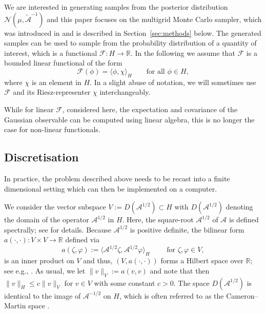 \documentclass[11pt,english]{article}
\theoremstyle{plain}
\theoremstyle{plain}
\theoremstyle{plain}
\theoremstyle{plain}
\numberwithin{equation}{section}
\newcommand{\rev}[1]{#1}
\newcommand{\jg}[1]{#1}
\begin{document}
We are interested in generating samples from the posterior distribution
$\mathcal{N}(\mu,\widetilde{\mathcal{A}}^{-1})$ and this paper focuses on the multigrid Monte Carlo sampler, which was introduced in \cite{goodman1989multigrid} and is described in Section~\ref{sec:methods} below.
\jg{The generated samples can be used to sample from the probability distribution of a quantity of interest,}   
which is a functional $\mathcal{F}:H\rightarrow \mathbb{R}$.
In the following we assume that $\mathcal{F}$ is a bounded linear functional of the form
\begin{equation}
	\mathcal{F}(\phi) = \langle \phi, \chi\rangle_H
	\qquad\text{for all $\phi\in H$},
	\label{eqn:qoi_linear}
\end{equation}
where $\chi$ is an element in $H$. 
In a slight abuse of notation, we will sometimes use $\mathcal{F}$ and
its Riesz-representer $\chi$ interchangeably.

\jg{While for linear $\mathcal{F}$, considered here, the expectation
  and covariance of the Gaussian observable can be computed using linear
  algebra, this is no longer the case for non-linear functionals.} 

\subsection{Discretisation\label{sec:discretisation}}

In practice, the problem described above needs to be recast into a finite
dimensional setting which can then be implemented on a computer.

We consider the vector subspace $V:=D(\mathcal{A}^{1/2})\subset H$
with $D(\mathcal{A}^{1/2})$ denoting the domain of the operator $\mathcal{A}^{1/2}$
in $H$. Here, the square-root $\mathcal{A}^{1/2}$ of $\mathcal{A}$
is defined spectrally\rev{; see \cite[Section
  3.7]{Sell.G_You_2013_book} for details}.
Because $\mathcal{A}^{1/2}$ is positive
definite, the bilinear form $a(\cdot,\cdot)\colon V\times V\to\mathbb{R}$
defined via
\begin{equation}
	a(\zeta,\varphi):=
	\langle\mathcal{A}^{1/2}\zeta,\mathcal{A}^{1/2}\varphi\rangle_{H}\qquad\text{ for }\zeta,\varphi\in V,\label{eq:bilin-a}
\end{equation}
is an inner product on $V$ and thus, 
$(V,a(\cdot,\cdot))$ %
forms a Hilbert space \rev{over $\mathbb{R}$}; see e.g., \cite[Section 3.7]{Sell.G_You_2013_book}.
As usual, we let $\|v\|_{V} := a(v,v)$ and note that then $\|v\|_{H}\leq c\|v\|_{V}$ for $v\in V$ with some constant
$c>0$. The space $D(\mathcal{A}^{1/2})$ is identical to the image of $\mathcal{A}^{-1/2}$
on $H$, which is often referred to as the Cameron--Martin space
\cite{DaPrato.G_2006_IntroductionInfiniteDimensionalAnalysis,Lifshits.M.A_2012_Lectures_on_Gaussian}.
\end{document}
